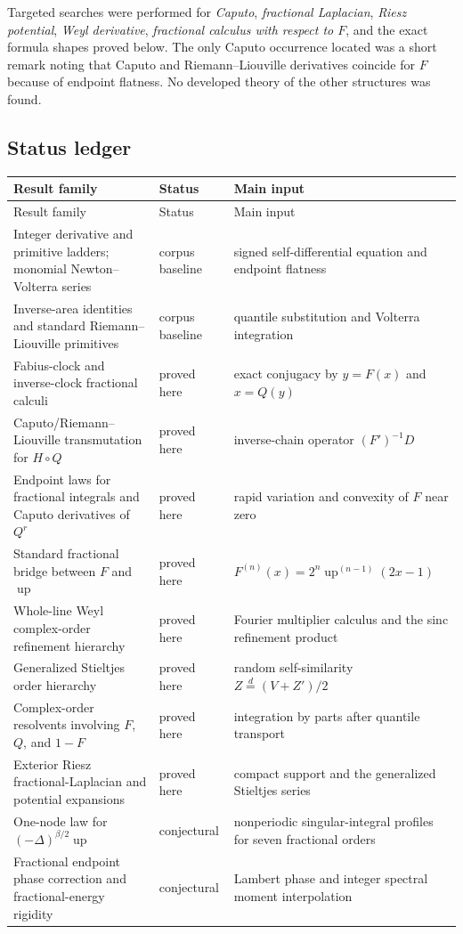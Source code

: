 \documentclass[11pt,oneside]{article}
\theoremstyle{definition}
\theoremstyle{remark}
\newcommand{\Up}{\operatorname{up}}
\newcommand{\1}{\mathbf 1}
\begin{document}
Targeted searches were performed for \emph{Caputo}, \emph{fractional
Laplacian}, \emph{Riesz potential}, \emph{Weyl derivative},
\emph{fractional calculus with respect to $F$}, and the exact formula shapes
proved below.  The only Caputo occurrence located was a short remark noting
that Caputo and Riemann--Liouville derivatives coincide for $F$ because of
endpoint flatness.  No developed theory of the other structures was found.

\subsection{Status ledger}

\begin{longtable}{@{}p{}p{}p{}@{}}
\toprule
Result family & Status & Main input \\
\midrule
\endfirsthead
\toprule
Result family & Status & Main input \\
\midrule
\endhead
Integer derivative and primitive ladders; monomial Newton--Volterra series
& corpus baseline & signed self-differential equation and endpoint flatness\\
Inverse-area identities and standard Riemann--Liouville primitives
& corpus baseline & quantile substitution and Volterra integration\\
Fabius-clock and inverse-clock fractional calculi
& proved here & exact conjugacy by $y=F(x)$ and $x=Q(y)$\\
Caputo/Riemann--Liouville transmutation for $H\circ Q$
& proved here & inverse-chain operator $(F')^{-1}D$\\
Endpoint laws for fractional integrals and Caputo derivatives of $Q^r$
& proved here & rapid variation and convexity of $F$ near zero\\
Standard fractional bridge between $F$ and $\Up$
& proved here & $F^{(n)}(x)=2^n\Up^{(n-1)}(2x-1)$\\
Whole-line Weyl complex-order refinement hierarchy
& proved here & Fourier multiplier calculus and the sinc refinement product\\
Generalized Stieltjes order hierarchy
& proved here & random self-similarity $Z\overset d=(V+Z')/2$\\
Complex-order resolvents involving $F$, $Q$, and $1-F$
& proved here & integration by parts after quantile transport\\
Exterior Riesz fractional-Laplacian and potential expansions
& proved here & compact support and the generalized Stieltjes series\\
One-node law for $(-\Delta)^{\beta/2}\Up$
& conjectural & nonperiodic singular-integral profiles for seven fractional orders\\
Fractional endpoint phase correction and fractional-energy rigidity
& conjectural & Lambert phase and integer spectral moment interpolation\\
\bottomrule
\end{longtable}
\end{document}
